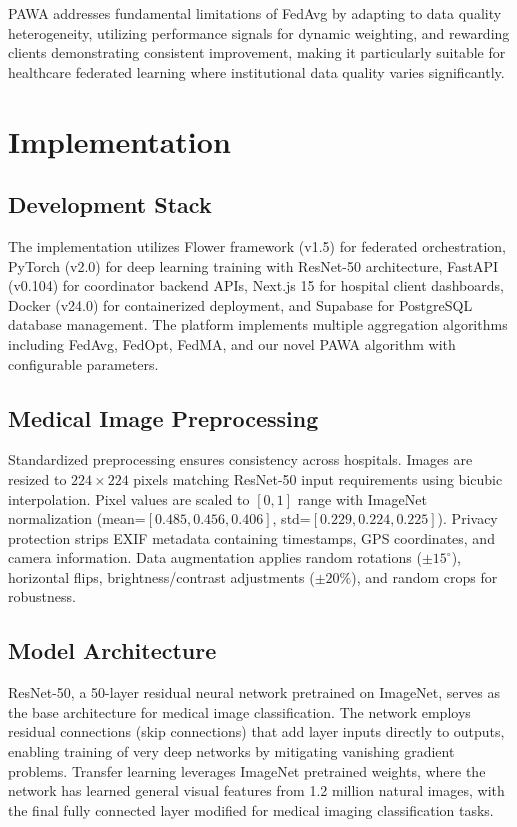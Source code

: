 \documentclass[conference]{IEEEtran}
\begin{document}
PAWA addresses fundamental limitations of FedAvg by adapting to data quality heterogeneity, utilizing performance signals for dynamic weighting, and rewarding clients demonstrating consistent improvement, making it particularly suitable for healthcare federated learning where institutional data quality varies significantly.

\section{Implementation}

\subsection{Development Stack}
The implementation utilizes Flower framework (v1.5) for federated orchestration, PyTorch (v2.0) for deep learning training with ResNet-50 architecture, FastAPI (v0.104) for coordinator backend APIs, Next.js 15 for hospital client dashboards, Docker (v24.0) for containerized deployment, and Supabase for PostgreSQL database management. The platform implements multiple aggregation algorithms including FedAvg, FedOpt, FedMA, and our novel PAWA algorithm with configurable parameters.

\subsection{Medical Image Preprocessing}
Standardized preprocessing ensures consistency across hospitals. Images are resized to $224\times 224$ pixels matching ResNet-50 input requirements using bicubic interpolation. Pixel values are scaled to $[0,1]$ range with ImageNet normalization (mean=$[0.485, 0.456, 0.406]$, std=$[0.229, 0.224, 0.225]$). Privacy protection strips EXIF metadata containing timestamps, GPS coordinates, and camera information. Data augmentation applies random rotations ($\pm 15^\circ$), horizontal flips, brightness/contrast adjustments ($\pm 20\%$), and random crops for robustness.

\subsection{Model Architecture}
ResNet-50, a 50-layer residual neural network pretrained on ImageNet, serves as the base architecture for medical image classification. The network employs residual connections (skip connections) that add layer inputs directly to outputs, enabling training of very deep networks by mitigating vanishing gradient problems. Transfer learning leverages ImageNet pretrained weights, where the network has learned general visual features from 1.2 million natural images, with the final fully connected layer modified for medical imaging classification tasks.
\end{document}
